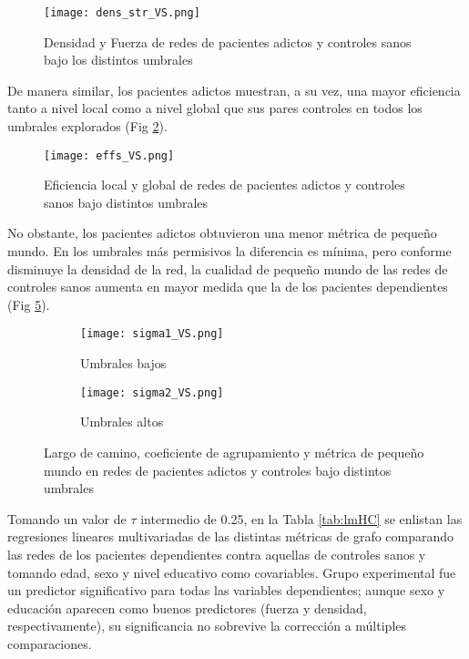 \begin{figure}[!ht]
    \centering
    \texttt{[image: dens\_str\_VS.png]}
    \caption{Densidad y Fuerza de redes de pacientes adictos y controles sanos bajo los distintos umbrales}
    \label{fig:dsHC}
\end{figure}

De manera similar, los pacientes adictos muestran, a su vez, una mayor eficiencia tanto a nivel local como a nivel global que sus pares controles en todos los umbrales explorados (Fig \ref{fig:effHC}).

\begin{figure}[!ht]
    \centering
    \texttt{[image: effs\_VS.png]}
    \caption{Eficiencia local y global de redes de pacientes adictos y controles sanos bajo distintos umbrales}
    \label{fig:effHC}
\end{figure}

No obstante, los pacientes adictos obtuvieron una menor métrica de pequeño mundo.
En los umbrales más permisivos la diferencia es mínima, pero conforme disminuye la densidad de la red, la cualidad de pequeño mundo de las redes de controles sanos aumenta en mayor medida que la de los pacientes dependientes (Fig \ref{fig:sigmaHC}).

\begin{figure}[!ht]
    \centering
    \begin{subfigure}[t]{0.45\textwidth}
        \centering
        \texttt{[image: sigma1\_VS.png]}
        \caption{Umbrales bajos}
        \label{fig:sigma1}
    \end{subfigure}
    \hfill
    \begin{subfigure}[t]{0.45\textwidth}
        \centering
        \texttt{[image: sigma2\_VS.png]}
        \caption{Umbrales altos}
        \label{fig:sigma2}
    \end{subfigure}
    \caption{Largo de camino, coeficiente de agrupamiento y métrica de pequeño mundo en redes de pacientes adictos y controles bajo distintos umbrales}
    \label{fig:sigmaHC}
\end{figure}

Tomando un valor de $\tau$ intermedio de 0.25, en la Tabla \ref{tab:lmHC} se enlistan las regresiones lineares multivariadas de las distintas métricas de grafo comparando las redes de los pacientes dependientes contra aquellas de controles sanos y tomando edad, sexo y nivel educativo como covariables. Grupo experimental fue un predictor significativo para todas las variables dependientes; aunque sexo y educación aparecen como buenos predictores (fuerza y densidad, respectivamente), su significancia no sobrevive la corrección a múltiples comparaciones.

